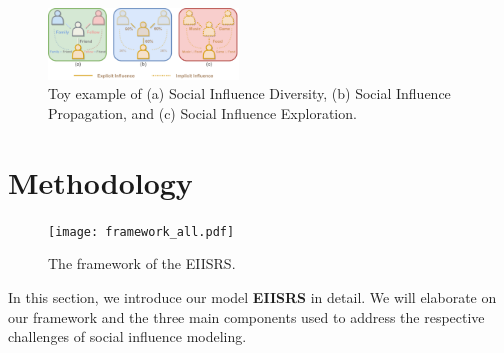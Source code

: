 \documentclass[letterpaper]{article} %
\begin{document}
\begin{figure}[ht!]
  \centering
  \includegraphics[width=0.451\textwidth]{motivation.pdf} %
  \caption{Toy example of (a) Social Influence Diversity, (b) Social Influence Propagation, and (c) Social Influence Exploration.}
  \label{fig_motivation}
\end{figure}

\section{Methodology}
\begin{figure}[ht]
  \centering
  \texttt{[image: framework\_all.pdf]}
  \caption{The framework of the EIISRS.}
  \label{framework_all.pdf}
\end{figure}

In this section, we introduce our model \textbf{EIISRS} in detail. We will elaborate on our framework and the three main components used to address the respective challenges of social influence modeling.
\end{document}
